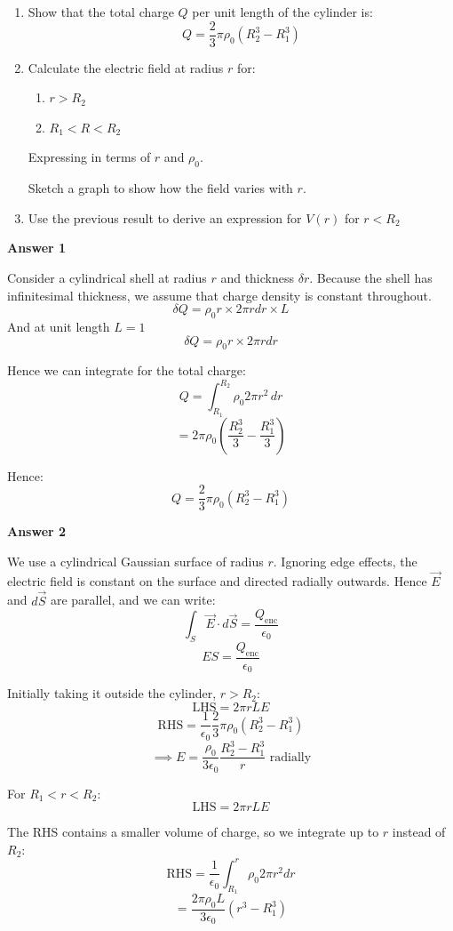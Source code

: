 \begin{enumerate}
    \item Show that the total charge $Q$ per unit length of the cylinder is:
\[
    Q = \frac{2}{3} \pi \rho_0 \left(R_2^3 - R_1^3\right)
\]
    \item Calculate the electric field at radius $r$ for:
    \begin{enumerate}
        \item $r > R_2$
        \item $R_1 < R < R_2$
    \end{enumerate}
    Expressing in terms of $r$ and $\rho_0$.

    Sketch a graph to show how the field varies with $r$.
    
    \item Use the previous result to derive an expression for $V(r)$ for $r < R_2$
\end{enumerate}

\textbf{Answer 1}

Consider a cylindrical shell at radius $r$ and thickness $\delta r$. Because the shell has infinitesimal thickness, we assume that charge density is constant throughout.
\[
    \delta Q = \rho_0 r \times 2 \pi r dr \times L
\]
And at unit length $L = 1$
\[
    \delta Q = \rho_0 r \times 2 \pi r dr
\]

Hence we can integrate for the total charge:
\[
    Q = \int_{R_1}^{R_2} \rho_0 2 \pi r^2 \, dr
\]
\[
    = 2 \pi \rho_0 \left(\frac{R_2^3}{3} - \frac{R_1^3}{3}\right)
\]

Hence:
\[
    Q = \frac{2}{3} \pi \rho_0 \left(R_2^3 - R_1^3\right)
\]

\textbf{Answer 2}

We use a cylindrical Gaussian surface of radius $r$. Ignoring edge effects, the electric field is constant on the surface and directed radially outwards. Hence $\vec{E}$ and $d \vec{S}$ are parallel, and we can write:
\[
    \int_S \vec{E} \cdot d \vec{S} = \frac{Q_\text{enc}}{\epsilon_0}
\]
\[
    ES = \frac{Q_\text{enc}}{\epsilon_0}
\]

Initially taking it outside the cylinder, $r > R_2$:
\[
    \text{LHS} = 2 \pi r L E
\]
\[
    \text{RHS} =\frac{1}{\epsilon_0} \frac{2}{3} \pi \rho_0 \left(R_2^3 - R_1^3\right)
\]
\[
\implies E = \frac{\rho_0}{3 \epsilon_0} \frac{R_2^3 - R_1^3}{r} \text{ radially}
\]

For $R_1 < r < R_2$:
\[
    \text{LHS} = 2 \pi r L E
\]

The RHS contains a smaller volume of charge, so we integrate up to $r$ instead of $R_2$:
\[
    \text{RHS} = \frac{1}{\epsilon_0} \int_{R_1}^r \rho_0 2 \pi r^2 dr
\]
\[
    = \frac{2 \pi \rho_0 L}{3 \epsilon_0} \left(r^3 - R_1^3\right)
\]

